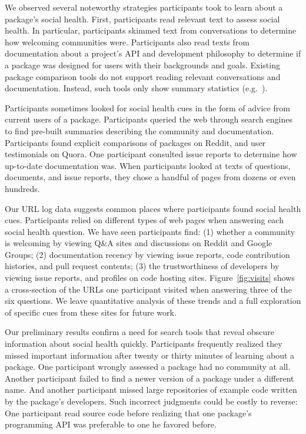 We observed several noteworthy strategies participants took to learn about a package's social health.
First, participants read relevant text to assess social health.
In particular, participants skimmed text from conversations to determine how welcoming communities were.
Participants also read texts from documentation about a project's API and development philosophy to determine if a package was designed for users with their backgrounds and goals.
Existing package comparison tools do not support reading relevant conversations and documentation.
Instead, such tools only show summary statistics (e.g.~\cite{awesome_python,ruby_toolbox}).

Participants sometimes looked for social health cues in the form of advice from current users of a package.
Participants queried the web through search engines to find pre-built summaries describing the community and documentation.
Participants found explicit comparisons of packages on Reddit, and user testimonials on Quora.
One participant consulted issue reports to determine how up-to-date documentation was.
When participants looked at texts of questions, documents, and issue reports, they chose a handful of pages from dozens or even hundreds.

Our URL log data suggests common places where participants found social health cues.
Participants relied on different types of web pages when answering each social health question.
We have seen participants find:
(1) whether a community is welcoming by viewing Q\&A sites and discussions on Reddit and Google Groups;
(2) documentation recency by viewing issue reports, code contribution histories, and pull request contents;
(3) the trustworthiness of developers by viewing issue reports, and profiles on code hosting sites.
Figure~\ref{fig:visits} shows a cross-section of the URLs one participant visited when answering three of the six questions.
We leave quantitative analysis of these trends and a full exploration of specific cues from these sites for future work.

Our preliminary results confirm a need for search tools that reveal obscure information about social health quickly.
Participants frequently realized they missed important information after twenty or thirty minutes of learning about a package.
One participant wrongly assessed a package had no community at all.
Another participant failed to find a newer version of a package under a different name.
And another participant missed large repositories of example code written by the package's developers.
Such incorrect judgments could be costly to reverse:
One participant read source code before realizing that one package's programming API was preferable to one he favored before.

